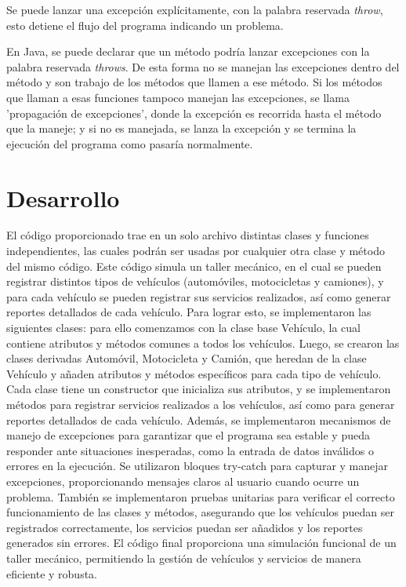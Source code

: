 \documentclass[letterpaper,12pt]{article}
\begin{document}
\begin{itemize}
    Se puede lanzar una excepción explícitamente, con la palabra reservada \textit{throw}, esto detiene el flujo del programa indicando un problema.

    En Java, se puede declarar que un método podría lanzar excepciones con la palabra reservada \textit{throws}. De esta forma no se manejan las excepciones dentro del método y son trabajo de los métodos que llamen a ese método. Si los métodos que llaman a esas funciones tampoco manejan las excepciones, se llama 'propagación de excepciones', donde la excepción es recorrida hasta el método que la maneje; y si no es manejada, se lanza la excepción y se termina la ejecución del programa como pasaría normalmente.      ~\cite{Excepciones}

    

\end{itemize}

\section{Desarrollo}
El código proporcionado trae en un solo archivo distintas clases y funciones independientes, las cuales podrán ser usadas por cualquier otra clase y método del mismo código. Este código simula un taller mecánico, en el cual se pueden registrar distintos tipos de vehículos (automóviles, motocicletas y camiones), y para cada vehículo se pueden registrar sus servicios realizados, así como generar reportes detallados de cada vehículo. Para lograr esto, se implementaron las siguientes clases: para ello comenzamos con la clase base Vehículo, la cual contiene atributos y métodos comunes a todos los vehículos. Luego, se crearon las clases derivadas Automóvil, Motocicleta y Camión, que heredan de la clase Vehículo y añaden atributos y métodos específicos para cada tipo de vehículo.
Cada clase tiene un constructor que inicializa sus atributos, y se implementaron métodos para registrar servicios realizados a los vehículos, así como para generar reportes detallados de cada vehículo. Además, se implementaron mecanismos de manejo de excepciones para garantizar que el programa sea estable y pueda responder ante situaciones inesperadas, como la entrada de datos inválidos o errores en la ejecución. Se utilizaron bloques try-catch para capturar y manejar excepciones, proporcionando mensajes claros al usuario cuando ocurre un problema. También se implementaron pruebas unitarias para verificar el correcto funcionamiento de las clases y métodos, asegurando que los vehículos puedan ser registrados correctamente, los servicios puedan ser añadidos y los reportes generados sin errores. 
El código final proporciona una simulación funcional de un taller mecánico, permitiendo la gestión de vehículos y servicios de manera eficiente y robusta. 
\end{document}
